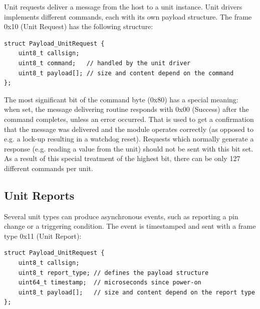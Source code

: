 Unit requests deliver a message from the host to a unit instance. Unit drivers implements different commands, each with its own payload structure. The frame 0x10 (Unit Request) has the following structure:

\begin{verbatim}
struct Payload_UnitRequest {
    uint8_t callsign;
    uint8_t command;   // handled by the unit driver
    uint8_t payload[]; // size and content depend on the command
};
\end{verbatim}

The most significant bit of the command byte (0x80) has a special meaning: when set, the message delivering routine responds with 0x00 (Success) after the command completes, unless an error occurred. That is used to get a confirmation that the message was delivered and the module operates correctly (as opposed to e.g. a lock-up resulting in a watchdog reset). Requests which normally generate a response (e.g. reading a value from the unit) should not be sent with this bit set. As a result of this special treatment of the highest bit, there can be only 127 different commands per unit.

\subsection{Unit Reports}

Several unit types can produce asynchronous events, such as reporting a pin change or a triggering condition. The event is timestamped and sent with a frame type 0x11 (Unit Report):

\begin{verbatim}
struct Payload_UnitRequest {
    uint8_t callsign;
    uint8_t report_type; // defines the payload structure
    uint64_t timestamp;  // microseconds since power-on
    uint8_t payload[];   // size and content depend on the report type
};
\end{verbatim}


















